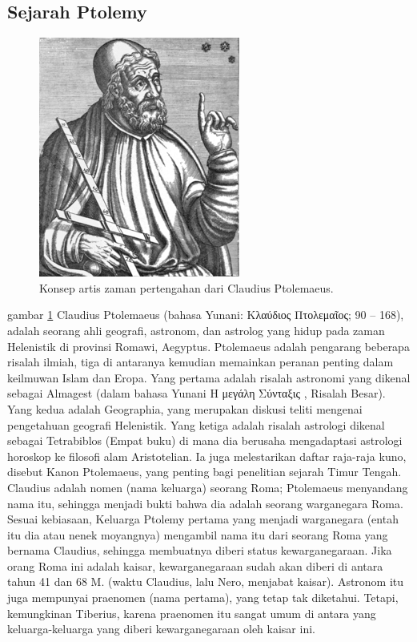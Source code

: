 \subsection{Sejarah Ptolemy}
	\begin{figure} [ht]
	\centerline{\includegraphics[width=.5\textwidth]{figures/Ptolemyporg}}
	\caption{Konsep artis zaman pertengahan dari Claudius Ptolemaeus.}
	\label{Ptolemyporg}
	\end{figure}
    gambar \ref{Ptolemyporg} Claudius Ptolemaeus (bahasa Yunani: Κλαύδιος Πτολεμαῖος; 90 – 168), adalah seorang ahli geografi, astronom, dan astrolog yang hidup pada zaman Helenistik di provinsi Romawi, Aegyptus.
    Ptolemaeus adalah pengarang beberapa risalah ilmiah, tiga di antaranya kemudian memainkan peranan penting dalam keilmuwan Islam dan Eropa. Yang pertama adalah risalah astronomi yang dikenal sebagai Almagest (dalam bahasa Yunani Η μεγάλη Σύνταξις , Risalah Besar). Yang kedua adalah Geographia, yang merupakan diskusi teliti mengenai pengetahuan geografi Helenistik. Yang ketiga adalah risalah astrologi dikenal sebagai Tetrabiblos (Empat buku) di mana dia berusaha mengadaptasi astrologi horoskop ke filosofi alam Aristotelian. Ia juga melestarikan daftar raja-raja kuno, disebut Kanon Ptolemaeus, yang penting bagi penelitian sejarah Timur Tengah.
    Claudius adalah nomen (nama keluarga) seorang Roma; Ptolemaeus menyandang nama itu, sehingga menjadi bukti bahwa dia adalah seorang warganegara Roma. Sesuai kebiasaan, Keluarga Ptolemy pertama yang menjadi warganegara (entah itu dia atau nenek moyangnya) mengambil nama itu dari seorang Roma yang bernama Claudius, sehingga membuatnya diberi status kewarganegaraan. Jika orang Roma ini adalah kaisar, kewarganegaraan sudah akan diberi di antara tahun 41 dan 68 M. (waktu Claudius, lalu Nero, menjabat kaisar). Astronom itu juga mempunyai praenomen (nama pertama), yang tetap tak diketahui. Tetapi, kemungkinan Tiberius, karena praenomen itu sangat umum di antara yang keluarga-keluarga yang diberi kewarganegaraan oleh kaisar ini.
